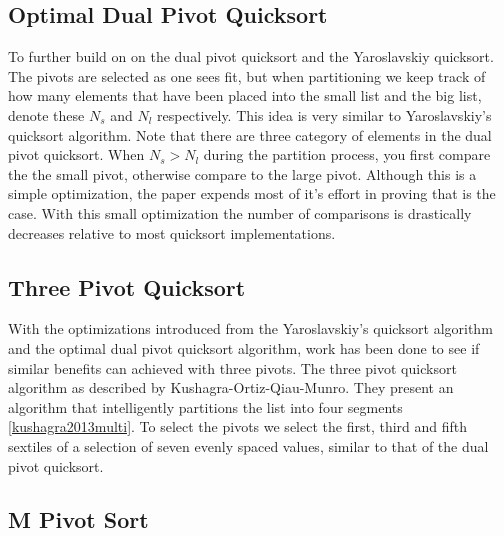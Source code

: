     \subsection{Optimal Dual Pivot Quicksort}
		\label{subsec:OptimalDualPivotQSortIntro}

		To further build on on the dual pivot quicksort and the Yaroslavskiy quicksort\cite{Aumuller:2013:OPD:2525857.2525862}. The pivots are selected as one sees fit, but when partitioning we keep track of how many elements that have been placed into the small list and the big list, denote these $N_s$ and $N_l$ respectively. This idea is very similar to Yaroslavskiy's quicksort algorithm. Note that there are three category of elements in the dual pivot quicksort. When $N_s > N_l$ during the partition process, you first compare the the small pivot, otherwise compare to the large pivot. Although this is a simple optimization, the paper expends most of it's effort in proving that is the case\cite{Aumuller:2013:OPD:2525857.2525862}. With this small optimization the number of comparisons is drastically decreases relative to most quicksort implementations.
		
	\subsection{Three Pivot Quicksort}	
		\label{subsec:ThreePivotQSortIntro}	
		With the optimizations introduced from the Yaroslavskiy's quicksort algorithm and the optimal dual pivot quicksort algorithm, work has been done to see if similar benefits can achieved with three pivots. The three pivot quicksort algorithm as described by Kushagra-Ortiz-Qiau-Munro. They present an algorithm that intelligently partitions the list into four segments \ref{kushagra2013multi}. To select the pivots we select the first, third and fifth sextiles of a selection of seven evenly spaced values, similar to that of the dual pivot quicksort. 
		
	\subsection{M Pivot Sort}	
		\label{subsec:MPivotQSortIntro}
		
